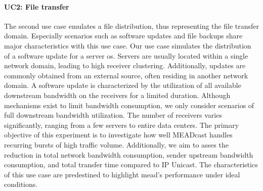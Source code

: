 \paragraph{UC2: File transfer} %
\label{par:EX2: File tranfer}
The second use case emulates a file distribution, thus representing the
    file transfer domain.
Especially scenarios such as software updates and file backups share major
    characteristics with this use case.
Our use case simulates the distribution of a software update for a server
    \gls{os}.
Servers are usually located within a single network domain, leading to high
    receiver clustering.
Additionally, updates are commonly obtained from an external source, often
    residing in another network domain.
A software update is characterized by the utilization of all available
    downstream bandwidth on the receivers for a limited duration.
Although mechanisms exist to limit bandwidth consumption, we only consider 
    scenarios of full downstream bandwidth utilization.
The number of receivers varies significantly, ranging from a few servers to
    entire data centers.
The primary objective of this experiment is to investigate how well MEADcast
    handles recurring bursts of high traffic volume.
Additionally, we aim to asses the reduction in total network bandwidth
    consumption, sender upstream bandwidth consumption, and total transfer time 
    compared to IP Unicast.
The characteristics of this use case are predestined to highlight \gls{mead}'s
    performance under ideal conditions.

